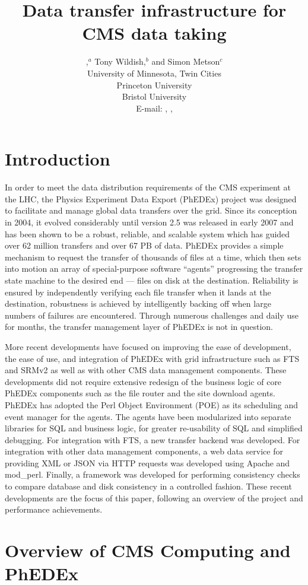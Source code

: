 \documentclass{PoS}
\title{Data transfer infrastructure for CMS data taking}
\author{
  \speaker{Ricky Egeland},$^a$ Tony Wildish,$^{b}$ and Simon Metson$^{c}$\\ 
  \llap{$^a$}University of Minnesota, Twin Cities\\ 
  \llap{$^b$}Princeton University\\ 
  \llap{$^c$}Bristol University\\ 
  E-mail: \email{Ricky.Egeland@cern.ch}, \email{Tony.Wildish@cern.ch}, \email{Simon.Metson@cern.ch}
}
\begin{document}
\section{Introduction}

In order to meet the data distribution requirements
\cite{cms-comp-proposal, cms-comp-tdr, cms-comp-model} of the CMS
\cite{cms-proposal} experiment at the LHC, the Physics Experiment Data
Export (PhEDEx) \cite{phedex-chep06, phedex-chep07} project was
designed to facilitate and manage global data transfers over the grid.
Since its conception in 2004, it evolved considerably until version
2.5 was released in early 2007 and has been shown to be a robust,
reliable, and scalable system which has guided over 62 million
transfers and over 67 PB of data.  PhEDEx provides a simple mechanism
to request the transfer of thousands of files at a time, which then
sets into motion an array of special-purpose software ``agents''
progressing the transfer state machine to the desired end --- files on
disk at the destination.  Reliability is ensured by independently
verifying each file transfer when it lands at the destination,
robustness is achieved by intelligently backing off when large numbers
of failures are encountered.  Through numerous challenges and daily
use for months, the transfer management layer of PhEDEx is not in
question.

More recent developments have focused on improving the ease of
development, the ease of use, and integration of PhEDEx with grid
infrastructure such as FTS and SRMv2 as well as with other CMS data
management components.  These developments did not require extensive
redesign of the business logic of core PhEDEx components such as the
file router and the site download agents.  PhEDEx has adopted the Perl
Object Environment (POE) as its scheduling and event manager for the
agents.  The agents have been modularized into separate libraries for
SQL and business logic, for greater re-usability of SQL and simplified
debugging.  For integration with FTS, a new transfer backend was
developed.  For integration with other data management components, a
web data service for providing XML or JSON via HTTP requests was
developed using Apache and mod\_perl.  Finally, a framework was
developed for performing consistency checks to compare database and
disk consistency in a controlled fashion.  These recent developments
are the focus of this paper, following an overview of the
project and performance achievements.

\section{Overview of CMS Computing and PhEDEx}
\end{document}
